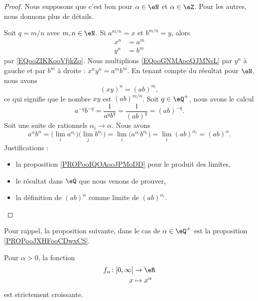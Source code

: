 \begin{proof}
	Nous supposons que c'est bon pour \( \alpha\in \eN\) et \( \alpha\in \eZ\). Pour les autres, nous donnons plus de détails.
	\begin{subproof}
		\spitem[\( \eQ^+\)]
		Soit \( q=m/n\) avec \( m,n\in \eN\). Si \( a^{m/n}=x\) et \( b^{m/n}=y\), alors
		\begin{subequations}
			\begin{align}
				x^n & =a^m    \label{EQooGNMAooQJMNsL} \\
				y^n & =b^m
			\end{align}
		\end{subequations}
		par \eqref{EQooZIKKooVfjkZo}. Nous multiplions \eqref{EQooGNMAooQJMNsL} par \( y^n\) à gauche et par \( b^m\) à droite : \( x^ny^n=a^mb^m\). En tenant compte du résultat pour \( \eN\), nous avons
		\begin{equation}
			(xy)^n=(ab)^m,
		\end{equation}
		ce qui signifie que le nombre \( xy\) est \( (ab)^{m/n}\).
		\spitem[Pour \( \eQ^-\)]
		Soit \( q\in \eQ^+ \), nous avons le calcul
		\begin{equation}
			a^{-q}b^{-q}=\frac{1}{ a^qb^q }=\frac{1}{ (ab)^q }=(ab)^{-q}.
		\end{equation}
		\spitem[Pour \( \eR\)]
		Soit une suite de rationnels \( \alpha_i\to \alpha\). Nous avons
		\begin{equation}
			a^{\alpha}b^{\alpha}=\big( \lim_ia^{\alpha_i} \big)\big( \lim_j b^{\alpha_j} \big)=\lim_i\big( a^{\alpha_i}b^{\alpha_i}\big)=\lim_i(ab)^{\alpha_i}=(ab)^{\alpha}.
		\end{equation}
		Justifications :
		\begin{itemize}
			\item la proposition \ref{PROPooIQOAooJPMoDD} pour le produit des limites,
			\item le résultat dans \( \eQ\) que nous venons de prouver,
			\item la définition de \( (ab)^{\alpha}\) comme limite de \( (ab)^{\alpha_i}\).
		\end{itemize}
	\end{subproof}
\end{proof}

Pour rappel, la proposition suivante, dans le cas de \( \alpha\in \eQ^+\) est la proposition \ref{PROPooJXHFooCDwxCS}.
\begin{proposition}     \label{PROPooUOFKooYyGwIr}
	Pour \( \alpha>0\), la fonction
	\begin{equation}
		\begin{aligned}
			f_{\alpha}\colon\mathopen] 0 , \infty \mathclose[ & \to \eR            \\
			x                                                 & \mapsto x^{\alpha}
		\end{aligned}
	\end{equation}
	est strictement croissante.
\end{proposition}

